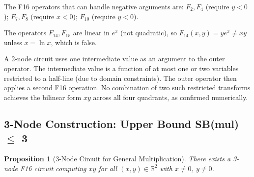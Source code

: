 \documentclass[12pt]{article}
\newtheorem{proposition}[theorem]{Proposition}
\theoremstyle{definition}
\begin{document}
The F16 operators that can handle negative arguments are:
$F_2, F_4$ (require $y < 0$);
$F_7, F_8$ (require $x < 0$);
$F_{10}$ (require $y < 0$).

The operators $F_{14}, F_{15}$ are linear in $e^x$ (not quadratic), so
$F_{14}(x, y) = ye^x \neq xy$ unless $x = \ln x$, which is false.

A 2-node circuit uses one intermediate value as an argument to the outer
operator.  The intermediate value is a function of at most one or two variables
restricted to a half-line (due to domain constraints).  The outer operator then
applies a second F16 operation.  No combination of two such restricted transforms
achieves the bilinear form $xy$ across all four quadrants, as confirmed
numerically.

\subsection{3-Node Construction: Upper Bound SB(mul) $\leq$ 3}

\begin{proposition}[3-Node Circuit for General Multiplication]
There exists a 3-node F16 circuit computing $xy$ for all $(x, y) \in \mathbb{R}^2$
with $x \neq 0$, $y \neq 0$.
\end{proposition}
\end{document}
